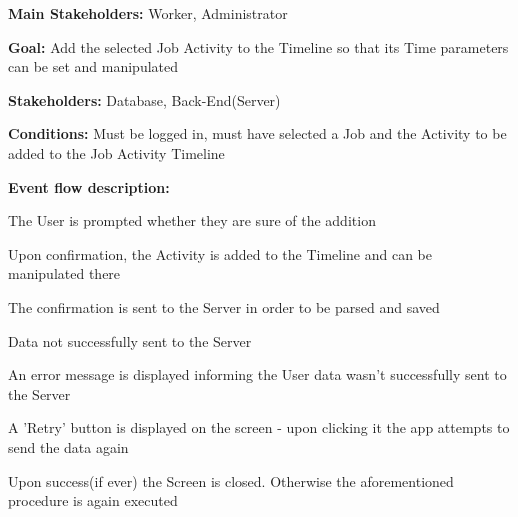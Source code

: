 			\noindent {}
			\begin{packed_item}
				\item \textbf{Main Stakeholders:} Worker, Administrator
				\item \textbf{Goal:} Add the selected Job Activity to the Timeline so that its Time parameters can be set and manipulated
				\item \textbf{Stakeholders: } Database, Back-End(Server)
				\item \textbf{Conditions: } Must be logged in, must have selected a Job and the Activity to be added to the Job Activity Timeline
				\item \textbf{Event flow description: }
				\begin{packed_enum}
					\item The User is prompted whether they are sure of the addition
					\item Upon confirmation, the Activity is added to the Timeline and can be manipulated there
					\item The confirmation is sent to the Server in order to be parsed and saved
				\end{packed_enum}
				
				\begin{packed_item}
					\item[3.a] Data not successfully sent to the Server
					\item[] \begin{packed_enum}
						\item An error message is displayed informing the User data wasn't successfully sent to the Server
						\item A 'Retry' button is displayed on the screen - upon clicking it the app attempts to send the data again
						\item Upon success(if ever) the Screen is closed. Otherwise the aforementioned procedure is again executed
					\end{packed_enum}
				\end{packed_item}
			\end{packed_item}
		
